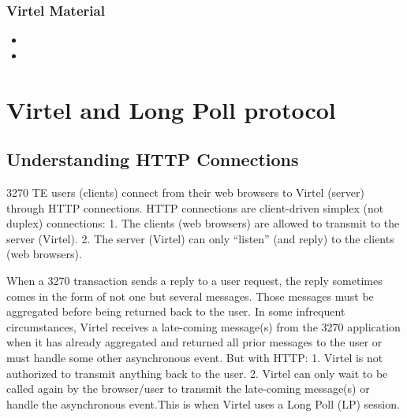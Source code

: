 \documentclass[letterpaper,10pt,english]{sphinxmanual}
\begin{document}
\subsection{Virtel Material}
\label{\detokenize{connectivity_guide:virtel-material}}\begin{itemize}
\item {} 

\item {} 

\end{itemize}

\ignorespaces 

\chapter{Virtel and Long Poll protocol}
\label{\detokenize{connectivity_guide:virtel-and-long-poll-protocol}}\label{\detokenize{connectivity_guide:index-163}}

\section{Understanding HTTP Connections}
\label{\detokenize{connectivity_guide:understanding-http-connections}}
3270 TE users (clients) connect from their web browsers to Virtel (server) through HTTP connections. HTTP connections are client-driven simplex (not duplex) connections:
1.      The clients (web browsers) are allowed to transmit to the server (Virtel).
2.      The server (Virtel) can only “listen” (and reply) to the clients (web browsers).

When a 3270 transaction sends a reply to a user request, the reply sometimes comes in the form of not one but several messages. Those messages must be aggregated before being returned back to the user. In some infrequent circumstances, Virtel receives a late-coming message(s) from the 3270 application when it has already aggregated and returned all prior messages to the user or must handle some other asynchronous event. But with HTTP:
1.      Virtel is not authorized to transmit anything back to the user.
2.      Virtel can only wait to be called again by the browser/user to transmit the late-coming message(s) or handle the asynchronous event.This is when Virtel uses a Long Poll (LP) session.
\end{document}
